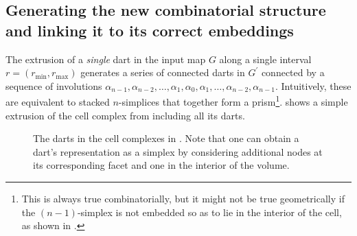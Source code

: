 \subsection{Generating the new combinatorial structure and linking it to its correct embeddings}
\label{ss:combinatorial}

The extrusion of a \emph{single} dart in the input map $G$ along a single interval $r = (r_{\min}, r_{\max})$ generates a series of connected darts in $G^\prime$ connected by a sequence of involutions $\alpha_{n-1}, \alpha_{n-2}, \ldots, \alpha_{1}, \alpha_{0}, \alpha_{1}, \ldots, \alpha_{n-2}, \alpha_{n-1}$.
Intuitively, these are equivalent to stacked $n$-simplices that together form a prism\footnote{This is always true combinatorially, but it might not be true geometrically if the $(n-1)$-simplex is not embedded so as to lie in the interior of the cell, as shown in .}.
 shows a simple extrusion of the cell complex from  including all its darts.

\begin{figure}[tbp]
\centering
{}
\quad
{}
\caption[The darts in the cell complexes in ]{The darts in the cell complexes in .
Note that one can obtain a dart's representation as a simplex by considering additional nodes at its corresponding facet and one in the interior of the volume.}
\label{fig:triangle}
\end{figure}

